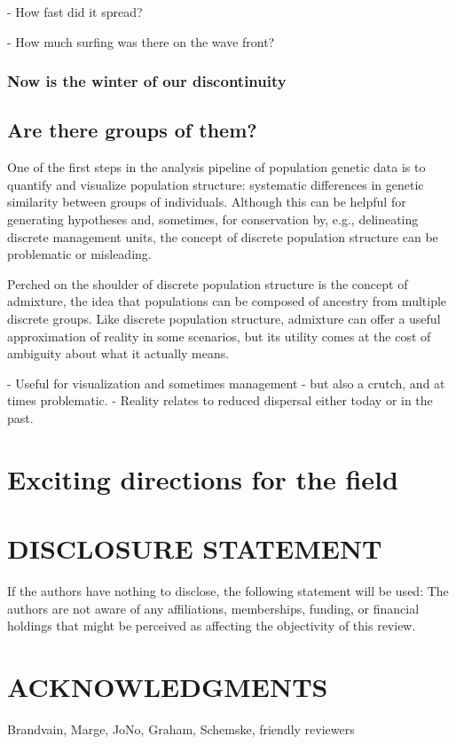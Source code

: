 \documentclass{ar-1col}
\begin{document}
        - How fast did it spread?

        - How much surfing was there on the wave front?

\subsubsection{Now is the winter of our discontinuity}

\subsection{Are there groups of them?}
One of the first steps in the analysis pipeline of population genetic data 
is to quantify and visualize population structure:
systematic differences in genetic similarity between groups of individuals.
Although this can be helpful for generating hypotheses 
and, sometimes, for conservation by, e.g., delineating discrete management units, 
the concept of discrete population structure 
can be problematic or misleading.


Perched on the shoulder of discrete population structure is the concept of admixture, 
the idea that populations can be composed of ancestry from multiple discrete groups.
Like discrete population structure, 
admixture can offer a useful approximation of reality in some scenarios, 
but its utility comes at the cost of ambiguity about what it actually means.

    - Useful for visualization and sometimes management
    - but also a crutch, and at times problematic.
    - Reality relates to reduced dispersal either today or in the past.


\section{Exciting directions for the field}

\section*{DISCLOSURE STATEMENT}
If the authors have nothing to disclose, the following statement will be used: The authors are not aware of any affiliations, memberships, funding, or financial holdings that
might be perceived as affecting the objectivity of this review. 

\section*{ACKNOWLEDGMENTS}
Brandvain, Marge, JoNo, Graham, Schemske, friendly reviewers
\end{document}
